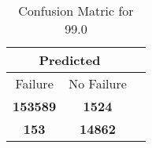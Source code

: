 \begin{table}[] 
\caption{Confusion Matric for 99.0} 
\label{Table: Prediction Accuracy-None99.0DecisionTrees100EKF-ignoreReflection-Reflection} 
\centering 
\begin{tabular} 
 {@{}ccc@{}} 
\toprule 
\multicolumn{2}{c}{\textbf{Predicted}}
 \\ \midrule 
\multicolumn{1}{|c|}{Failure} & 
\multicolumn{1}{c|}{No Failure}
 \\ \midrule 
\multicolumn{1}{|c|}{\color{green}\textbf{153589}} & 
\multicolumn{1}{c|}{\color{red}\textbf{1524}}
 \\ \midrule 
\multicolumn{1}{|c|}{\color{red}\textbf{153}} & 
\multicolumn{1}{c|}{\color{green}\textbf{14862}}
 \\ \bottomrule 
\end{tabular} 
\end{table} 

